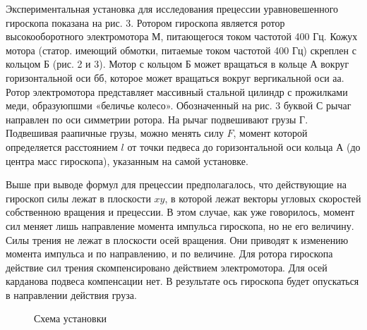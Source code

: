 \documentclass[14pt]{article}
\begin{document}
Экспериментальная установка для исследования прецессии уравновешенного гироскопа показана на рис. 3. Ротором гироскопа является ротор высокооборотного электромотора М, питающегося током частотой 400 Гц. Кожух мотора (статор. имеющий обмотки, питаемые током частотой 400 Гц) скреплен с кольцом Б (рис. 2 и 3). Мотор с кольцом Б может вращаться в кольце А вокруг горизонтальной оси $\text{бб}$, которое может вращаться вокруг вергикальной оси $\text{аа}$. Ротор электромотора представляет массивный стальной цилиндр с прожилками меди, образуюпшми «беличье колесо». Обозначенный на рис. 3 буквой С рычаг направлен по оси симметрии ротора. На рычаг подвешивают грузы Г. Подвешивая раапичные грузы, можно менять силу $F$, момент которой определяется расстоянием $l$ от точки педвеса до горизонтальной оси кольца А (до центра масс гироскопа), указанным на самой установке.

Выше при выводе формул для прецессии предполагалось, что действующие на гироскоп силы лежат в плоскости $xy$, в которой лежат векторы угловых скоростей собственною вращения и прецессии. В этом случае, как уже говорилось, момент сил меняет лишь направление момента импульса гироскопа, но не его величину. Силы трения не лежат в плоскости осей вращения. Они приводят к изменению момента импульса и по направлению, и по величине. Для ротора гироскопа действие сил трения скомпенсировано действием электромотора. Для осей карданова подвеса компенсации нет. В результате ось гироскопа будет опускаться в направлении действия груза. 

\begin{figure}[h!]
	\caption{Схема установки}
	\label{fig:image}
\end{figure} 
\end{document}
